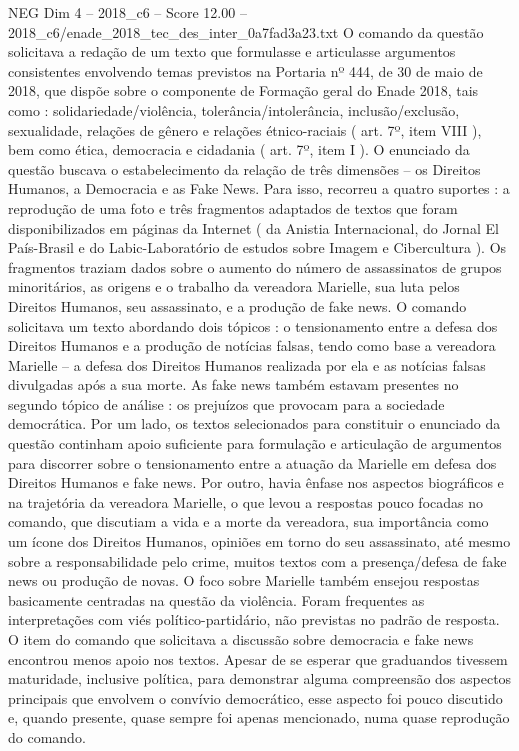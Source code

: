 \begin{textsample}{NEG Dim 4 – 2018\_c6 – Score 12.00 – 2018\_c6/enade\_2018\_tec\_des\_inter\_0a7fad3a23.txt}
O comando da questão solicitava a redação de um texto que formulasse e articulasse argumentos consistentes envolvendo temas previstos na Portaria nº 444, de 30 de maio de 2018, que dispõe sobre o componente de Formação geral do Enade 2018, tais como : solidariedade/violência, tolerância/intolerância, inclusão/exclusão, sexualidade, relações de gênero e relações étnico-raciais ( art. 7º, item VIII ), bem como ética, democracia e cidadania ( art. 7º, item I ).
O enunciado da questão buscava o estabelecimento da relação de três dimensões – os Direitos Humanos, a Democracia e as Fake News.
Para isso, recorreu a quatro suportes : a reprodução de uma foto e três fragmentos adaptados de textos que foram disponibilizados em páginas da Internet ( da Anistia Internacional, do Jornal El País-Brasil e do Labic-Laboratório de estudos sobre Imagem e Cibercultura ).
Os fragmentos traziam dados sobre o aumento do número de assassinatos de grupos minoritários, as origens e o trabalho da vereadora Marielle, sua luta pelos Direitos Humanos, seu assassinato, e a produção de fake news.
O comando solicitava um texto abordando dois tópicos : o tensionamento entre a defesa dos Direitos Humanos e a produção de notícias falsas, tendo como base a vereadora Marielle – a defesa dos Direitos Humanos realizada por ela e as notícias falsas divulgadas após a sua morte.
As fake news também estavam presentes no segundo tópico de análise : os prejuízos que provocam para a sociedade democrática.
Por um lado, os textos selecionados para constituir o enunciado da questão continham apoio suficiente para formulação e articulação de argumentos para discorrer sobre o tensionamento entre a atuação da Marielle em defesa dos Direitos Humanos e fake news.
Por outro, havia ênfase nos aspectos biográficos e na trajetória da vereadora Marielle, o que levou a respostas pouco focadas no comando, que discutiam a vida e a morte da vereadora, sua importância como um ícone dos Direitos Humanos, opiniões em torno do seu assassinato, até mesmo sobre a responsabilidade pelo crime, muitos textos com a presença/defesa de fake news ou produção de novas.
O foco sobre Marielle também ensejou respostas basicamente centradas na questão da violência.
Foram frequentes as interpretações com viés político-partidário, não previstas no padrão de resposta.
O item do comando que solicitava a discussão sobre democracia e fake news encontrou menos apoio nos textos.
Apesar de se esperar que graduandos tivessem maturidade, inclusive política, para demonstrar alguma compreensão dos aspectos principais que envolvem o convívio democrático, esse aspecto foi pouco discutido e, quando presente, quase sempre foi apenas mencionado, numa quase reprodução do comando.

\end{textsample}
